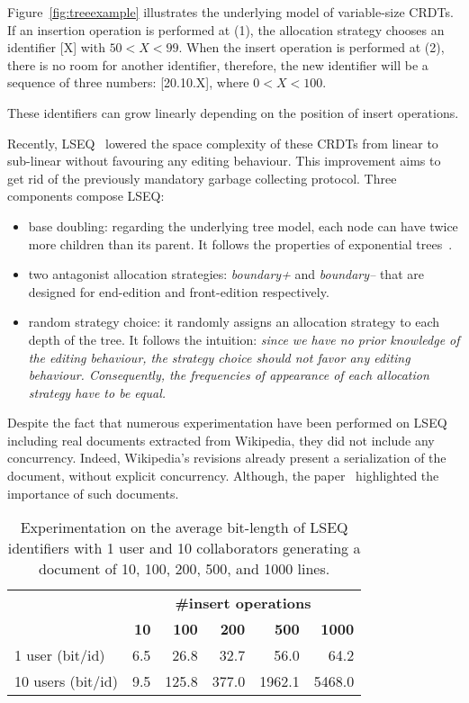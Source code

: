 Figure~\ref{fig:treeexample} illustrates the underlying model of variable-size
CRDTs.  If an insertion operation is performed at (1), the allocation strategy
chooses an identifier [X] with $50<X<99$. When the insert operation is
performed at (2), there is no room for another identifier, therefore, the new
identifier will be a sequence of three numbers: [20.10.X], where $0<X<100$.

These identifiers can grow linearly depending on the position of insert
operations.

Recently, LSEQ~\cite{nedelec2013lseq} lowered the space complexity of these
CRDTs from linear to sub-linear without favouring any editing behaviour. This
improvement aims to get rid of the previously mandatory garbage collecting
protocol. Three components compose LSEQ:
\begin{itemize}
\item{base doubling:} regarding the underlying tree model, each node can have
  twice more children than its parent. It follows the properties of exponential
  trees~\cite{andersson2007dynamic}.
\item{two antagonist allocation strategies:} \emph{boundary+} and
  \emph{boundary--} that are designed for end-edition and front-edition
  respectively.
\item{random strategy choice:} it randomly assigns an allocation strategy to
  each depth of the tree. It follows the intuition: \emph{since we have no
    prior knowledge of the editing behaviour, the strategy choice should not
    favor any editing behaviour. Consequently, the frequencies of appearance of
    each allocation strategy have to be equal.}
\end{itemize}

Despite the fact that numerous experimentation have been performed on LSEQ
including real documents extracted from Wikipedia, they did not include any
concurrency. Indeed, Wikipedia's revisions already present a serialization of
the document, without explicit concurrency. Although, the
paper~\cite{ahmed2011evaluating} highlighted the importance of such documents.

\begin{table}[h]
  \begin{center}
    \begin{tabular}{|l|r|r|r|r|r|}
      \cline{2-6}
      \multicolumn{1}{c|}{} & \multicolumn{5}{c|}{\textbf{\#insert operations}}
      \\
      \multicolumn{1}{c|}{} & \textbf{10} & \textbf{100} & \textbf{200}
      & \textbf{500} & \textbf{1000} \\
      \hline
      1 user (bit/id) & 6.5 & 26.8 & 32.7 & 56.0 & 64.2 \\
      \hline
      10 users (bit/id) & 9.5 & 125.8 & 377.0 & 1962.1 & 5468.0 \\
      \hline
    \end{tabular}
    \caption{Experimentation on the average bit-length of LSEQ identifiers
      with 1 user and 10 collaborators generating a document of 10, 100, 200,
      500, and 1000 lines.}
    \label{tab:motivating}
  \end{center}
\end{table} 

